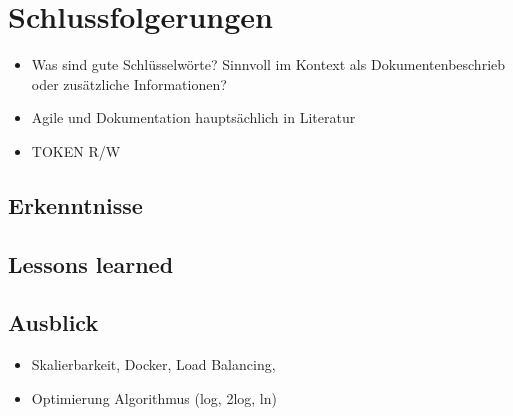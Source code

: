 \chapter{Schlussfolgerungen}

\begin{itemize}
    \item Was sind gute Schlüsselwörte? Sinnvoll im Kontext als Dokumentenbeschrieb oder zusätzliche Informationen?
    \item Agile und Dokumentation hauptsächlich in Literatur
    \item TOKEN R/W
\end{itemize}

\section{Erkenntnisse}
\section{Lessons learned}

\section{Ausblick}


\begin{itemize}
    \item Skalierbarkeit, Docker, Load Balancing, 
    \item Optimierung Algorithmus (log, 2log, ln)
\end{itemize}